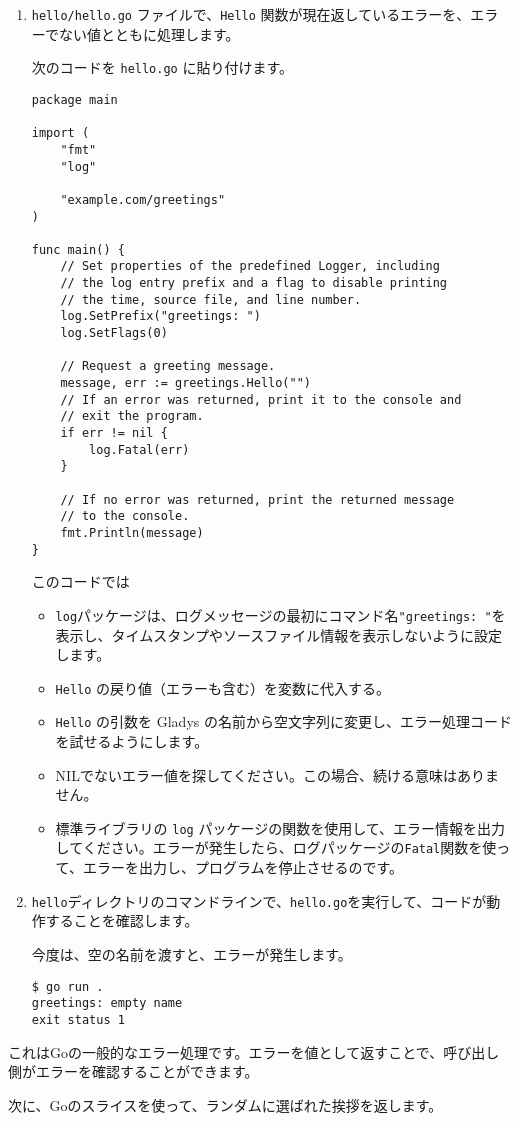 \begin{enumerate}
\item \texttt{hello/hello.go} ファイルで、\texttt{Hello} 関数が現在返しているエラーを、エラーでない値とともに処理します。

次のコードを \texttt{hello.go} に貼り付けます。

\begin{lstlisting}[numbers=none]
package main

import (
    "fmt"
    "log"

    "example.com/greetings"
)

func main() {
    // Set properties of the predefined Logger, including
    // the log entry prefix and a flag to disable printing
    // the time, source file, and line number.
    log.SetPrefix("greetings: ")
    log.SetFlags(0)

    // Request a greeting message.
    message, err := greetings.Hello("")
    // If an error was returned, print it to the console and
    // exit the program.
    if err != nil {
        log.Fatal(err)
    }

    // If no error was returned, print the returned message
    // to the console.
    fmt.Println(message)
}
\end{lstlisting}

このコードでは

\begin{itemize}
\item \texttt{log}パッケージは、ログメッセージの最初にコマンド名\texttt{"greetings: "}を表示し、タイムスタンプやソースファイル情報を表示しないように設定します。
\item \texttt{Hello} の戻り値（エラーも含む）を変数に代入する。
\item \texttt{Hello} の引数を Gladys の名前から空文字列に変更し、エラー処理コードを試せるようにします。
\item NILでないエラー値を探してください。この場合、続ける意味はありません。
\item 標準ライブラリの \texttt{log} パッケージの関数を使用して、エラー情報を出力してください。エラーが発生したら、ログパッケージの\texttt{Fatal}関数を使って、エラーを出力し、プログラムを停止させるのです。
\end{itemize}

\item \texttt{hello}ディレクトリのコマンドラインで、\texttt{hello.go}を実行して、コードが動作することを確認します。

今度は、空の名前を渡すと、エラーが発生します。

\begin{lstlisting}[numbers=none]
$ go run .
greetings: empty name
exit status 1
\end{lstlisting}

\end{enumerate}


これはGoの一般的なエラー処理です。エラーを値として返すことで、呼び出し側がエラーを確認することができます。

次に、Goのスライスを使って、ランダムに選ばれた挨拶を返します。

